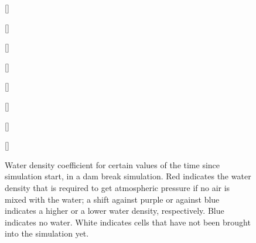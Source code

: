 \begin{figure}
    \centering
    [\screenshotwidth]{
        \begin{tikzpicture}[x={(\screenshotunitlength,0)},y={(0,\screenshotunitlength)}]
        
        \end{tikzpicture}
    }
    [\screenshotwidth]{
        \begin{tikzpicture}[x={(\screenshotunitlength,0)},y={(0,\screenshotunitlength)}]
        
        \end{tikzpicture}
    }
    [\screenshotwidth]{
       \begin{tikzpicture}[x={(\screenshotunitlength,0)},y={(0,\screenshotunitlength)}]
       
       \end{tikzpicture}
    }
    [\screenshotwidth]{
        \begin{tikzpicture}[x={(\screenshotunitlength,0)},y={(0,\screenshotunitlength)}]
        
        \end{tikzpicture}
    }
    [\screenshotwidth]{
        \begin{tikzpicture}[x={(\screenshotunitlength,0)},y={(0,\screenshotunitlength)}]
        
        \end{tikzpicture}
    }
    [\screenshotwidth]{
        \begin{tikzpicture}[x={(\screenshotunitlength,0)},y={(0,\screenshotunitlength)}]
        
        \end{tikzpicture}
    }
    [\screenshotwidth]{
        \begin{tikzpicture}[x={(\screenshotunitlength,0)},y={(0,\screenshotunitlength)}]
        
        \end{tikzpicture}
    }
    [\screenshotwidth]{
        \begin{tikzpicture}[x={(\screenshotunitlength,0)},y={(0,\screenshotunitlength)}]
        
        \end{tikzpicture}
    }
    \caption{Water density coefficient for certain values of the time since simulation start, in a dam break simulation. Red indicates the water density that is required to get atmospheric pressure if no air is mixed with the water; a shift against purple or against blue indicates a higher or a lower water density, respectively. Blue indicates no water. White indicates cells that have not been brought into the simulation yet.}
    \label{fig:screenshots_water_volume_coefficient}
\end{figure}

